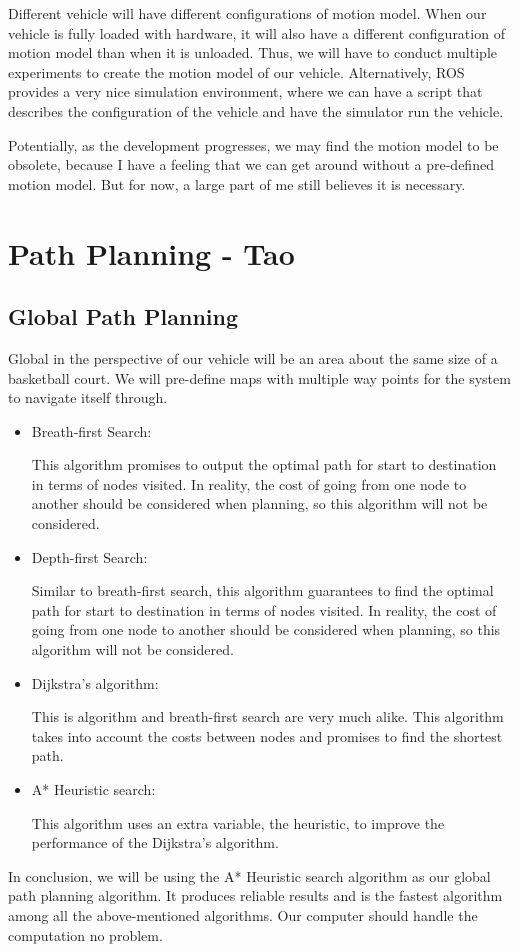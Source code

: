 \documentclass[compsoc,draftclsnofoot,onecolumn,10pt]{IEEEtran}
\begin{document}
Different vehicle will have different configurations of motion model. When our vehicle 
is fully loaded with hardware, it will also have a different configuration of motion 
model than when it is unloaded. Thus, we will have to conduct multiple experiments to 
create the motion model of our vehicle. Alternatively, ROS provides a very nice simulation 
environment, where we can have a script that describes the configuration of the vehicle 
and have the simulator run the vehicle.\par

Potentially, as the development progresses, we may find the motion model to be obsolete, 
because I have a feeling that we can get around without a pre-defined motion model. But 
for now, a large part of me still believes it is necessary.\par

\section{Path Planning - Tao}
\subsection{Global Path Planning}
Global in the perspective of our vehicle will be an area about the same size of a 
basketball court. We will pre-define maps with multiple way points for the system to 
navigate itself through.\par
\begin{itemize}
\item Breath-first Search:\par
This algorithm promises to output the optimal path for start to destination in terms 
of nodes visited. In reality, the cost of going from one node to another should be 
considered when planning, so this algorithm will not be considered. 
\item Depth-first Search:\par
Similar to breath-first search, this algorithm guarantees to find the optimal path 
for start to destination in terms of nodes visited. In reality, the cost of going 
from one node to another should be considered when planning, so this algorithm will 
not be considered. 
\item Dijkstra’s algorithm:\par
This is algorithm and breath-first search are very much alike. This algorithm takes 
into account the costs between nodes and promises to find the shortest path.
\item A* Heuristic search:\par
This algorithm uses an extra variable, the heuristic, to improve the performance 
of the Dijkstra’s algorithm. 
\end{itemize}
In conclusion, we will be using the A* Heuristic search algorithm as our global 
path planning algorithm. It produces reliable results and is the fastest algorithm 
among all the above-mentioned algorithms. Our computer should handle the computation 
no problem.\par  
\end{document}
